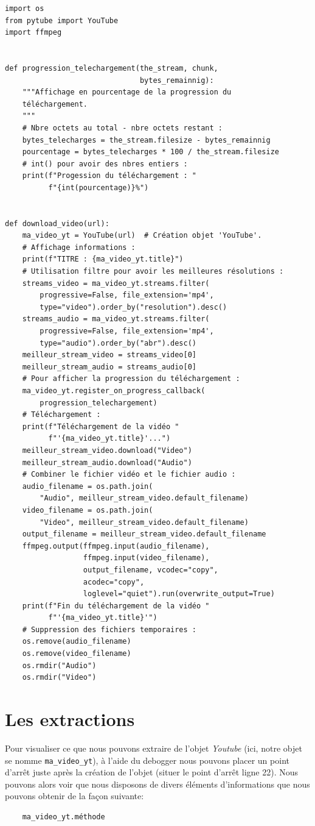 \documentclass[a4paper,12pt]{book}
\begin{document}
\begin{lstlisting}[caption=Le fichier \textit{yt\_downloader.py}]
import os
from pytube import YouTube
import ffmpeg


def progression_telechargement(the_stream, chunk, 
                               bytes_remainnig):
    """Affichage en pourcentage de la progression du 
    téléchargement.
    """
    # Nbre octets au total - nbre octets restant :
    bytes_telecharges = the_stream.filesize - bytes_remainnig
    pourcentage = bytes_telecharges * 100 / the_stream.filesize
    # int() pour avoir des nbres entiers :
    print(f"Progession du téléchargement : "
          f"{int(pourcentage)}%")


def download_video(url):
    ma_video_yt = YouTube(url)  # Création objet 'YouTube'.
    # Affichage informations :
    print(f"TITRE : {ma_video_yt.title}")
    # Utilisation filtre pour avoir les meilleures résolutions :
    streams_video = ma_video_yt.streams.filter(
        progressive=False, file_extension='mp4',
        type="video").order_by("resolution").desc()
    streams_audio = ma_video_yt.streams.filter(
        progressive=False, file_extension='mp4',
        type="audio").order_by("abr").desc()
    meilleur_stream_video = streams_video[0]
    meilleur_stream_audio = streams_audio[0]
    # Pour afficher la progression du téléchargement :
    ma_video_yt.register_on_progress_callback(
        progression_telechargement)
    # Téléchargement :
    print(f"Téléchargement de la vidéo "
          f"'{ma_video_yt.title}'...")
    meilleur_stream_video.download("Video")
    meilleur_stream_audio.download("Audio")
    # Combiner le fichier vidéo et le fichier audio :
    audio_filename = os.path.join(
        "Audio", meilleur_stream_video.default_filename)
    video_filename = os.path.join(
        "Video", meilleur_stream_video.default_filename)
    output_filename = meilleur_stream_video.default_filename
    ffmpeg.output(ffmpeg.input(audio_filename), 
                  ffmpeg.input(video_filename),
                  output_filename, vcodec="copy", 
                  acodec="copy", 
                  loglevel="quiet").run(overwrite_output=True)
    print(f"Fin du téléchargement de la vidéo "
          f"'{ma_video_yt.title}'")
    # Suppression des fichiers temporaires :
    os.remove(audio_filename)
    os.remove(video_filename)
    os.rmdir("Audio")
    os.rmdir("Video")
\end{lstlisting}
\medskip

\section{Les extractions}
Pour visualiser ce que nous pouvons extraire de l'objet \og \textit{Youtube}\fg{} (ici, notre objet se nomme \texttt{ma\_video\_yt}), à l'aide du debogger nous pouvons placer un point d'arrêt juste après la création de l'objet (situer le point d'arrêt ligne 22). Nous pouvons alors voir que nous disposons de divers éléments d'informations que nous pouvons obtenir de la façon suivante:
\begin{verbatim}
    ma_video_yt.méthode
\end{verbatim} 
\medskip
\end{document}
